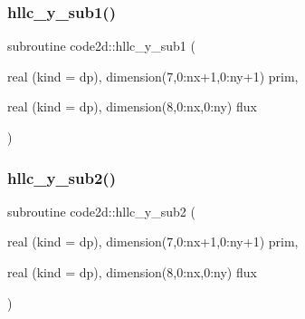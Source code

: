 \mbox{\label{main2Dv1_8f90_a3abf545225182ebde80c72121d2de6f2}} 
\subsubsection{\texorpdfstring{hllc\+\_\+y\+\_\+sub1()}{hllc\_y\_sub1()}}
{\footnotesize\ttfamily subroutine code2d\+::hllc\+\_\+y\+\_\+sub1 (\begin{DoxyParamCaption}\item[{real (kind = dp), dimension(7,0\+:nx+1,0\+:ny+1)}]{prim,  }\item[{real (kind = dp), dimension(8,0\+:nx,0\+:ny)}]{flux }\end{DoxyParamCaption})}

\mbox{\label{main2Dv1_8f90_a66b4ae2bdd9b70fca9079c3827fa8c30}} 
\subsubsection{\texorpdfstring{hllc\+\_\+y\+\_\+sub2()}{hllc\_y\_sub2()}}
{\footnotesize\ttfamily subroutine code2d\+::hllc\+\_\+y\+\_\+sub2 (\begin{DoxyParamCaption}\item[{real (kind = dp), dimension(7,0\+:nx+1,0\+:ny+1)}]{prim,  }\item[{real (kind = dp), dimension(8,0\+:nx,0\+:ny)}]{flux }\end{DoxyParamCaption})}

\mbox{\label{main2Dv1_8f90_afb1c4be5a540eb38b6217aa886b964a5}} 
